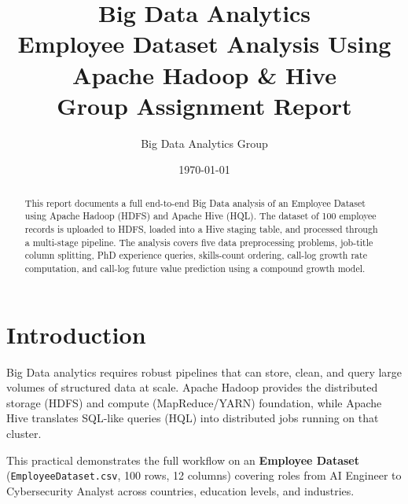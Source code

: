 \documentclass[11pt,a4paper]{article}
\title{
    \vspace{-1cm}
    {\Huge\bfseries\color{primary} Big Data Analytics}\\[0.4cm]
    {\Large\color{secondary} Employee Dataset Analysis Using Apache Hadoop \& Hive}\\[0.3cm]
    {\normalsize\color{gray} Group Assignment Report}
}
\author{Big Data Analytics Group}
\date{\today}
\begin{document}

\maketitle
\thispagestyle{fancy}

\begin{abstract}
This report documents a full end-to-end Big Data analysis of an Employee Dataset
using Apache Hadoop (HDFS) and Apache Hive (HQL). The dataset of 100 employee
records is uploaded to HDFS, loaded into a Hive staging table, and processed
through a multi-stage pipeline. The analysis covers five data preprocessing
problems, job-title column splitting, PhD experience queries, skills-count
ordering, call-log growth rate computation, and call-log future value prediction
using a compound growth model.
\end{abstract}

\tableofcontents
\newpage

\section{Introduction}
Big Data analytics requires robust pipelines that can store, clean, and query
large volumes of structured data at scale. Apache Hadoop provides the distributed
storage (HDFS) and compute (MapReduce/YARN) foundation, while Apache Hive
translates SQL-like queries (HQL) into distributed jobs running on that cluster.

This practical demonstrates the full workflow on an \textbf{Employee Dataset}
(\texttt{EmployeeDataset.csv}, 100 rows, 12 columns) covering roles from AI
Engineer to Cybersecurity Analyst across countries, education levels, and
industries.
\end{document}
